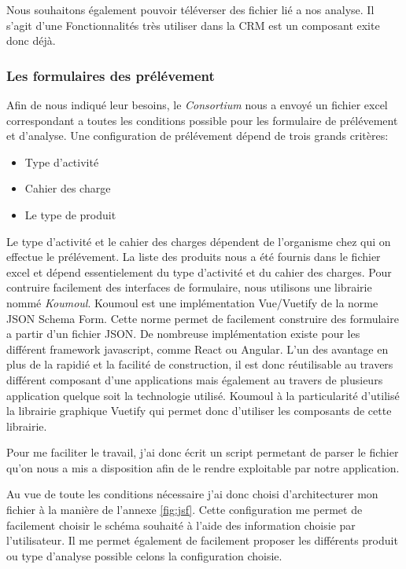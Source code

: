 Nous souhaitons également pouvoir téléverser des fichier lié a nos analyse. Il s'agit d'une Fonctionnalités très utiliser dans la CRM est un composant exite donc déjà. 

\subsubsection{Les formulaires des prélévement}

Afin de nous indiqué leur besoins, le \textit{Consortium} nous a envoyé un fichier excel correspondant a toutes les conditions possible pour les formulaire de prélévement et d'analyse. 
Une configuration de prélévement dépend de trois grands critères: 
\begin{itemize}
    \item Type d'activité
    \item Cahier des charge
    \item Le type de produit
\end{itemize}
Le type d'activité et le cahier des charges dépendent de l'organisme chez qui on effectue le prélévement. La liste des produits nous a été fournis dans le fichier excel et dépend essentielement du type d'activité et du cahier des charges. Pour contruire facilement des interfaces de formulaire, nous utilisons une librairie nommé \textit{Koumoul}\cite{koumoul}. Koumoul est une implémentation Vue/Vuetify de la norme JSON Schema Form\cite{jsf}. Cette norme permet de facilement construire des formulaire a partir d'un fichier JSON. De nombreuse implémentation existe pour les différent framework javascript, comme React ou Angular. L'un des avantage en plus de la rapidié et la facilité de construction, il est donc réutilisable au travers différent composant d'une applications mais également au travers de plusieurs application quelque soit la technologie utilisé. Koumoul à la particularité d'utilisé la librairie graphique Vuetify qui permet donc d'utiliser les composants de cette librairie.

Pour me faciliter le travail, j'ai donc écrit un script permetant de parser le fichier qu'on nous a mis a disposition afin de le rendre exploitable par notre application. 

Au vue de toute les conditions nécessaire j'ai donc choisi d'architecturer mon fichier à la manière de l'annexe \ref{fig:jsf}. Cette configuration me permet de facilement choisir le schéma souhaité à l'aide des information choisie par l'utilisateur. Il me permet également de facilement proposer les différents produit ou type d'analyse possible celons la configuration choisie.

